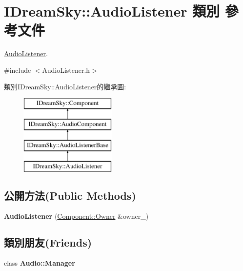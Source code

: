 \hypertarget{class_i_dream_sky_1_1_audio_listener}{}\section{I\+Dream\+Sky\+:\+:Audio\+Listener 類別 參考文件}
\label{class_i_dream_sky_1_1_audio_listener}


\hyperlink{class_i_dream_sky_1_1_audio_listener}{Audio\+Listener}.  




{\ttfamily \#include $<$Audio\+Listener.\+h$>$}

類別\+I\+Dream\+Sky\+:\+:Audio\+Listener的繼承圖\+:\begin{figure}[H]
\begin{center}
\leavevmode
\includegraphics[height=4.000000cm]{class_i_dream_sky_1_1_audio_listener}
\end{center}
\end{figure}
\subsection*{公開方法(Public Methods)}
\begin{DoxyCompactItemize}
\item 
{\bfseries Audio\+Listener} (\hyperlink{class_i_dream_sky_1_1_component_1_1_owner}{Component\+::\+Owner} \&owner\+\_\+)\hypertarget{class_i_dream_sky_1_1_audio_listener_a04b65ebd93b410654adfa1c9123feabf}{}\label{class_i_dream_sky_1_1_audio_listener_a04b65ebd93b410654adfa1c9123feabf}

\end{DoxyCompactItemize}
\subsection*{類別朋友(Friends)}
\begin{DoxyCompactItemize}
\item 
class {\bfseries Audio\+::\+Manager}\hypertarget{class_i_dream_sky_1_1_audio_listener_a3ad7b469f47b268897de410969c1c7cd}{}\label{class_i_dream_sky_1_1_audio_listener_a3ad7b469f47b268897de410969c1c7cd}

\end{DoxyCompactItemize}
